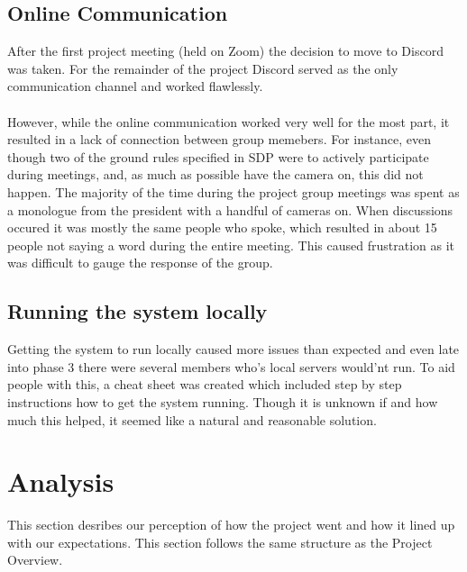 \documentclass{article}
\begin{document}
    \subsection{Online Communication \label{communication}}
        After the first project meeting (held on Zoom) the decision to move to
        Discord was taken. For the remainder of the project Discord served as the only communication channel
        and worked flawlessly.
        \\ \\
        However, while the online communication worked very well for the most part, it resulted
        in a lack of connection between group memebers. For instance, even though two of
        the ground rules specified in SDP were to actively participate during meetings,
        and, as much as possible have the camera on, this did not happen.
        The majority of the time during the project group meetings was
        spent as a monologue from the president with a handful of cameras on.
        When discussions occured it was mostly the same people who spoke, which resulted
        in about 15 people not saying a word during the entire meeting.
        This caused frustration as it was difficult to gauge the response of the group. 
    
    \subsection{Running the system locally \label{system_locally}}
        Getting the system to run locally caused more issues than expected and even late
        into phase 3 there were several members who's local servers would'nt run.
        To aid people with this, a cheat sheet was created which included step by step
        instructions how to get the system running. Though it is unknown if and how
        much this helped, it seemed like a natural and reasonable solution.
        

\section{Analysis \label{analysis}}
    This section desribes our perception of how the project went and how it lined up with our expectations. 
    This section follows the same structure as the Project Overview.
\end{document}
